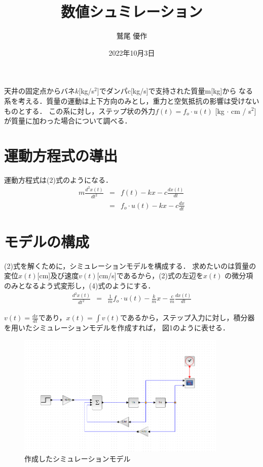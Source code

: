 \documentclass[dvipdfmx,titlepage,a4j]{jsarticle}  %
\title{数値シュミレーション}
\author{鷲尾 優作}
\date{2022年10月3日}
\begin{document}
\pagestyle{foot}


天井の固定点からバネ$k$[kg/s$^2$]でダンパc[kg/s]で支持された質量m[kg]から
なる系を考える．質量の運動は上下方向のみとし，重力と空気抵抗の影響は受けないものとする．
この系に対し，ステップ状の外力$f(t) = f_o \cdot u(t)$ [kg $\cdot$ cm / s$^2$]
が質量に加わった場合について調べる．

\section{運動方程式の導出}

運動方程式は(2)式のようになる．
\begin{eqnarray}
  m \frac{d^2x(t)}{dt^2} &=& f(t) - kx - c \frac{dx(t)}{dt}\\
  &=& f_o \cdot u(t) - kx - c \frac{dx}{dt}
\end{eqnarray}

\section{モデルの構成}
 
 (2)式を解くために，シミュレーションモデルを構成する．
求めたいのは質量の変位$x(t)$[cm]及び速度$v(t)$[cm/s]であるから，(2)式の左辺を$x(t)$
の微分項のみとなるよう式変形し，(4)式のようにする．
\begin{eqnarray}
  \frac{d^2x(t)}{dt^2} &=&  \frac{1}{m} f_o \cdot u(t) - \frac{k}{m} x - \frac{c}{m} \frac{dx(t)}{dt}
\end{eqnarray}

$v(t) = \frac{dx}{dt}$であり，$x(t) = \int v(t)$であるから，ステップ入力に対し，積分器を用いたシミュレーションモデルを作成すれば，
図1のように表せる．

\begin{figure}[H]
  \centering
  \includegraphics[width=10cm]{../graph/bane-model.png}
  \caption{作成したシミュレーションモデル}
  \label{fig:bane-model.png}
\end{figure}
\end{document}
